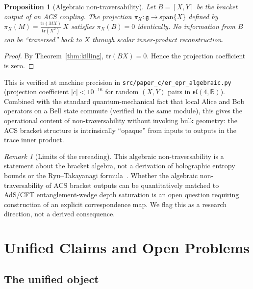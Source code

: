 \documentclass[11pt,a4paper]{article}
\theoremstyle{plain}
\newtheorem{proposition}[theorem]{Proposition}
\theoremstyle{definition}
\theoremstyle{remark}
\newtheorem{remark}[theorem]{Remark}
\begin{document}
\begin{proposition}[Algebraic non-traversability]\label{prop:non-trav}
Let $B = [X, Y]$ be the bracket output of an ACS coupling.  The
projection $\pi_X : \mathfrak{g} \to \mathrm{span}\{X\}$ defined by
\(
  \pi_X(M) = \frac{\mathrm{tr}(MX)}{\mathrm{tr}(X^2)}\,X
\)
satisfies $\pi_X(B) = 0$ identically.  No information from $B$ can
be ``traversed'' back to $X$ through scalar inner-product reconstruction.
\end{proposition}

\begin{proof}
By Theorem~\ref{thm:killing}, $\mathrm{tr}(BX) = 0$.  Hence the
projection coefficient is zero.
\end{proof}

\noindent
This is verified at machine precision in
\texttt{src/paper\_c/er\_epr\_algebraic.py} (projection coefficient
$|c| < 10^{-16}$ for random $(X, Y)$ pairs in $\mathfrak{sl}(4,\mathbb{R})$).
Combined with the standard quantum-mechanical fact that local Alice
and Bob operators on a Bell state commute (verified in the same module),
this gives the operational content of non-traversability without
invoking bulk geometry: the ACS bracket structure is intrinsically
``opaque'' from inputs to outputs in the trace inner product.

\begin{remark}[Limits of the rereading]
This algebraic non-traversability is a statement about the bracket
algebra, not a derivation of holographic entropy bounds or the
Ryu--Takayanagi formula~\cite{RyuTakayanagi2006}.  Whether the algebraic
non-traversability of ACS bracket outputs can be quantitatively
matched to AdS/CFT entanglement-wedge depth saturation is an
open question requiring construction of an explicit correspondence
map.  We flag this as a research direction, not a derived consequence.
\end{remark}

\section{Unified Claims and Open Problems}
\label{sec:unified}

\subsection{The unified object}
\end{document}
